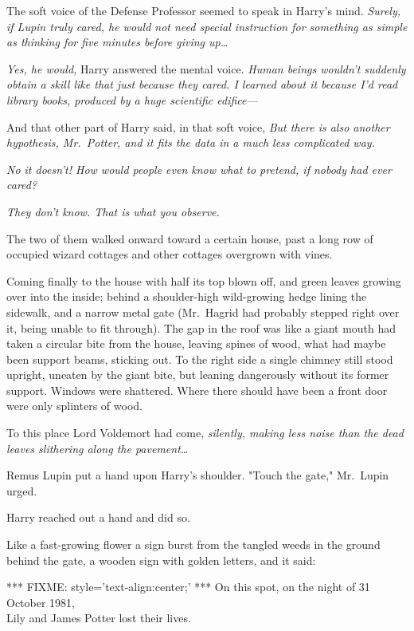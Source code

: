 The soft voice of the Defense Professor seemed to speak in Harry's mind. 
\emph{Surely, if Lupin truly cared, he would not need special instruction for 
something as simple as thinking for five minutes before giving up{\ldots}}

\emph{Yes, he would,} Harry answered the mental voice. \emph{Human beings 
wouldn't suddenly obtain a skill like that just because they cared. I learned 
about it because I'd read library books, produced by a huge scientific 
edifice---}

And that other part of Harry said, in that soft voice, \emph{But there is also 
another hypothesis, Mr.~Potter, and it fits the data in a much less complicated 
way.}

\emph{No it doesn't! How would people even know what to pretend, if nobody had 
ever cared?}

\emph{They don't know. That is what you observe.}

The two of them walked onward toward a certain house, past a long row of 
occupied wizard cottages and other cottages overgrown with vines.

Coming finally to the house with half its top blown off, and green leaves 
growing over into the inside; behind a shoulder-high wild-growing hedge lining 
the sidewalk, and a narrow metal gate (Mr.~Hagrid had probably stepped right 
over it, being unable to fit through). The gap in the roof was like a giant 
mouth had taken a circular bite from the house, leaving spines of wood, what 
had maybe been support beams, sticking out. To the right side a single chimney 
still stood upright, uneaten by the giant bite, but leaning dangerously without 
its former support. Windows were shattered. Where there should have been a 
front door were only splinters of wood.

To this place Lord Voldemort had come, \emph{silently, making less noise than 
the dead leaves slithering along the pavement{\ldots}}

Remus Lupin put a hand upon Harry's shoulder. "Touch the gate," Mr.~Lupin urged.

Harry reached out a hand and did so.

Like a fast-growing flower a sign burst from the tangled weeds in the ground 
behind the gate, a wooden sign with golden letters, and it said:

*** FIXME: style='text-align:center;' ***
On this spot, on the night of 31 October 1981,\\
Lily and James Potter lost their lives.

